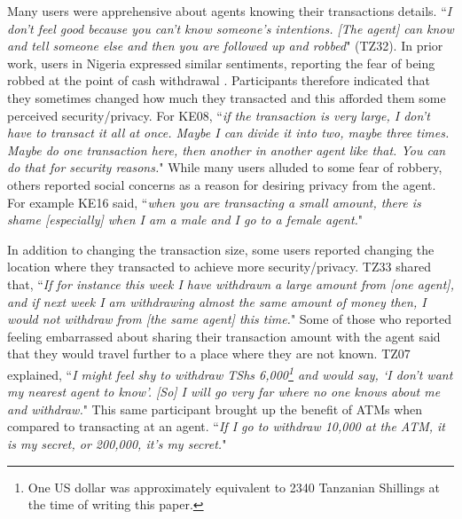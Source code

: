 \medskip
{} Many users were apprehensive about agents knowing their transactions details. ``\textit{I don’t feel good because you can’t know someone’s intentions. [The agent] can know and tell someone else and then you are followed up and robbed}" (TZ32). In prior work, users in Nigeria expressed similar sentiments, reporting the fear of being robbed at the point of cash withdrawal \cite{mogaji2022dark}. 
Participants therefore indicated that they sometimes changed how much they transacted and this afforded them some perceived security/privacy. For KE08, ``\textit{if the transaction is very large, I don’t have to transact it all at once. Maybe I can divide it into two, maybe three times. Maybe do one transaction here, then another in another agent like that. You can do that for security reasons.}" While many users alluded to some fear of robbery, others reported social concerns as a reason for desiring privacy from the agent. For example KE16 said, ``\textit{when you are transacting a small amount, there is shame [especially] when I am a male and I go to a female agent.}"

In addition to changing the transaction size, some users reported changing the location where they transacted to achieve more security/privacy. TZ33 shared that, ``\textit{If for instance this week I have withdrawn a large amount from [one agent], and if next week I am withdrawing almost the same amount of money then, I would not withdraw from [the same agent] this time.}" Some of those who reported feeling  embarrassed about sharing their transaction amount with the agent said that they would travel further to a place where they are not known.  TZ07 explained, ``\textit{I might feel shy to withdraw TShs 6,000\footnote{One US dollar was approximately equivalent to 2340 Tanzanian Shillings at the time of writing this paper.} and would say, `I don’t want my nearest agent to know'.  [So] I will go very far where no one knows about me and withdraw.}" This same participant brought up the benefit of ATMs when compared to transacting at an agent. ``\textit{If I go to withdraw 10,000 at the ATM, it is my secret, or 200,000, it's my secret.}"
